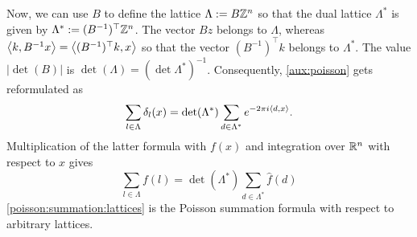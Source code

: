 Now, we can use $B$ to define the lattice $\Lambda : = B \mathbb{Z}^n$ so that the dual lattice $\Lambda^\ast$ is given by $\Lambda^\ast := (B^{-1})^\top \mathbb{Z}^n$. The vector $Bz $ belongs to $\Lambda$, whereas $\left\langle k , B^{-1} x \right\rangle = \left\langle  (B^{-1})^\top k , x \right\rangle$ so that the vector $(B^{-1})^\top k $ belongs to $\Lambda^\ast$. The value $|\det(B)|$ is $\det(\Lambda) = (\det \Lambda^\ast )^{-1}$. Consequently, \eqref{aux:poisson}  gets reformulated as 
\[
	\sum_{l \in \Lambda} \delta_l(x) = \det(\Lambda^\ast) \sum_{d \in \Lambda^\ast} e^{- 2 \pi i \left\langle d , x \right\rangle}. 
\]
Multiplication of the latter formula with $f(x)$ and integration over $\mathbb{R}^n$ with respect to $x$ gives 
\begin{equation} \label{poisson:summation:lattices} 
	\sum_{l \in \Lambda} f(l) = \det(\Lambda^\ast) \sum_{d \in \Lambda^\ast} \hat{f} (d) 
\end{equation}
\eqref{poisson:summation:lattices} is the Poisson summation formula with respect to arbitrary lattices. 